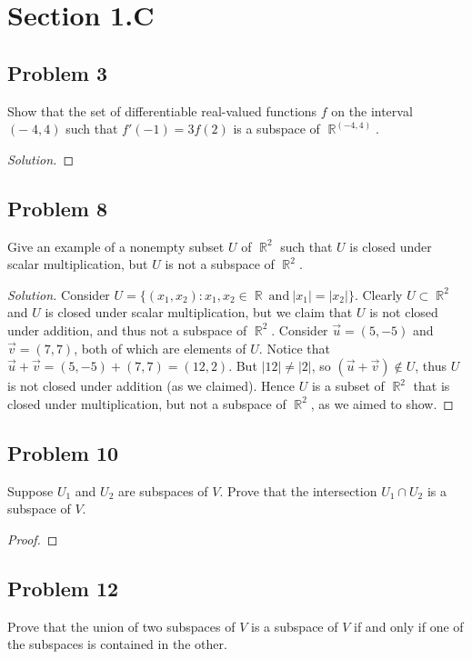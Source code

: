 \documentclass[letterpaper, 12pt]{amsart}
\DeclareMathOperator{\R}{\mathbb{R}}
\theoremstyle{definition}  %
\begin{document}
	\section*{Section 1.C}	
		\subsection*{Problem 3}
		Show that the set of differentiable real-valued functions $f$ on the interval $(-􏰈4, 4)$ such that $f'(-1) = 3f(2)$ is a subspace of $\R^{(-4,4)}$.

		\begin{proof}[Solution]
		\end{proof}

		\subsection*{Problem 8}
		Give an example of a nonempty subset $U$ of $\R^{2}$ such that $U$ is closed under scalar multiplication, but $U$ is not a subspace of $\R^{2}$.

		\begin{proof}[Solution]
		Consider $U = \{ (x_{1},x_{2}) : x_{1},x_{2} \in \R \ \text{and} \ |x_{1}| = |x_{2}| \}$.
		Clearly $U \subset \R^{2}$ and $U$ is closed under scalar multiplication, but we claim that $U$ is not closed under addition, and thus not a subspace of $\R^{2}$.
		Consider $\vec{u} = (5,-5)$ and $\vec{v} = (7,7)$, both of which are elements of $U$.
		Notice that $\vec{u} + \vec{v} = (5,-5) + (7,7) = (12,2)$.
		But $|12| \neq |2|$, so $(\vec{u} + \vec{v}) \notin U$, thus $U$ is not closed under addition (as we claimed).
		Hence $U$ is a subset of $\R^{2}$ that is closed under multiplication, but not a subspace of $\R^{2}$, as we aimed to show.
		\end{proof}	

		\subsection*{Problem 10}
		Suppose $U_{1}$ and $U_{2}$ are subspaces of $V$. 
		Prove that the intersection $U_{1} \cap U_{2}$ is a subspace of $V$.

		\begin{proof}		
		\end{proof}

		\subsection*{Problem 12}
		Prove that the union of two subspaces of $V$ is a subspace of $V$ if and only if one of the subspaces is contained in the other.
\end{document}
